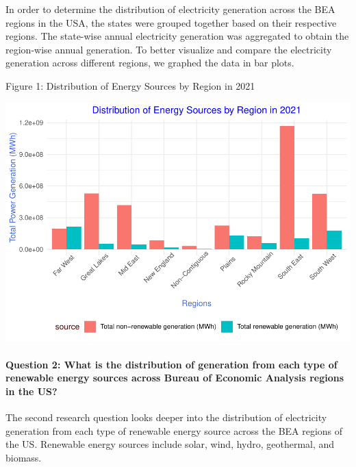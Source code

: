 \documentclass[
]{article}
\begin{document}
In order to determine the distribution of electricity generation across
the BEA regions in the USA, the states were grouped together based on
their respective regions. The state-wise annual electricity generation
was aggregated to obtain the region-wise annual generation. To better
visualize and compare the electricity generation across different
regions, we graphed the data in bar plots.

Figure 1: Distribution of Energy Sources by Region in 2021

\begin{center}\includegraphics{EDA_Project_Mutha_Kry_Ghosh_VS_files/figure-latex/Q1plot-1} \end{center}

\hypertarget{question-2-what-is-the-distribution-of-generation-from-each-type-of-renewable-energy-sources-across-bureau-of-economic-analysis-regions-in-the-us}{%
\paragraph{Question 2: What is the distribution of generation from each
type of renewable energy sources across Bureau of Economic Analysis
regions in the
US?}\label{question-2-what-is-the-distribution-of-generation-from-each-type-of-renewable-energy-sources-across-bureau-of-economic-analysis-regions-in-the-us}}

The second research question looks deeper into the distribution of
electricity generation from each type of renewable energy source across
the BEA regions of the US. Renewable energy sources include solar, wind,
hydro, geothermal, and biomass.
\end{document}

